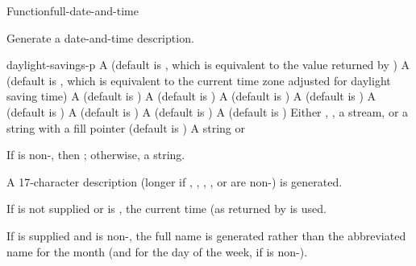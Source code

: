 \documentclass[10pt,twoside,english,pdftex]{article}
\begin{document}
\begin{functiondoc}{Function}{full-date-and-time}{%
     
     
    \returns{} }
%
%

\fnsyntax

\fnpurpose Generate a date-and-time description.

\fnpackage {} 

\fnmodule {}

\fnargs
\begin{args}{daylight-savings-p}
 A  (default is \nil,
  which is equivalent to the value returned by
  )
 A  (default is \nil,
  which is equivalent to the current time zone adjusted for daylight
  saving time)
 A  (default is \nil)        
 A  (default is \nil)
 A  (default is \nil)
 A  (default is \nil)
 A  (default is \nil)
 A  (default is 
  )
 A  (default is \nil)
\arg[12-hour] A  (default is \nil)
\arg[destination] Either \nil, , a stream, or a string with a fill 
pointer (default is \nil)
\arg[result] A string or \nil{}
\end{args}

\fnreturns If  is non-\nil, then \nil; otherwise, a string.

\fndescription A 17-character description (longer if
, ,
, , or
 are non-\nil{}) is generated.

\W{} 
%
%
If  is not supplied or is \nil, the current time
(as returned by  is used.

\W{} 
%
If  is supplied and is non-\nil, the full name is generated
rather than the abbreviated name for the month (and for the day of the week,
if  is non-\nil).


\end{functiondoc}
\end{document}
